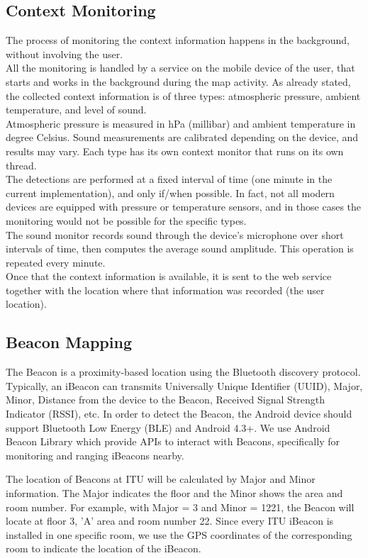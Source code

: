 \documentclass{sigchi}
\begin{document}
\subsection{Context Monitoring}
The process of monitoring the context information happens in the background, without involving the user. \\
All the monitoring is handled by a service on the mobile device of the user, that starts and works in the background during the map activity.
As already stated, the collected context information is of three types: atmospheric pressure, ambient temperature, and level of sound. \\
Atmospheric pressure is measured in hPa (millibar) and ambient temperature in degree Celsius.
Sound measurements are calibrated depending on the device, and results may vary.
Each type has its own context monitor that runs on its own thread. \\
The detections are performed at a fixed interval of time (one minute in the current implementation), and only if/when possible. In fact, not all modern devices are equipped with pressure or temperature sensors, and in those cases the monitoring would not be possible for the specific types.\\
The sound monitor records sound through the device's microphone over short intervals of time, then computes the average sound amplitude. This operation is repeated every minute. \\
Once that the context information is available, it is sent to the web service together with the location where that information was recorded (the user location).

\subsection{Beacon Mapping}
The Beacon is a proximity-based location using the Bluetooth discovery protocol.
Typically, an iBeacon can transmits Universally Unique Identifier (UUID), Major, Minor, Distance from the device to the Beacon, Received Signal Strength Indicator (RSSI), etc.
In order to detect the Beacon, the Android device should support Bluetooth Low Energy (BLE) and Android 4.3+.
We use Android Beacon Library which provide APIs to interact with Beacons, specifically for monitoring and ranging iBeacons nearby.

The location of Beacons at ITU will be calculated by Major and Minor information.
The Major indicates the floor and the Minor shows the area and room number.
For example, with Major = 3 and Minor = 1221, the Beacon will locate at floor 3, 'A' area and room number 22.
Since every ITU iBeacon is installed in one specific room, we use the GPS coordinates of the corresponding room to indicate the location of the iBeacon.
\end{document}
